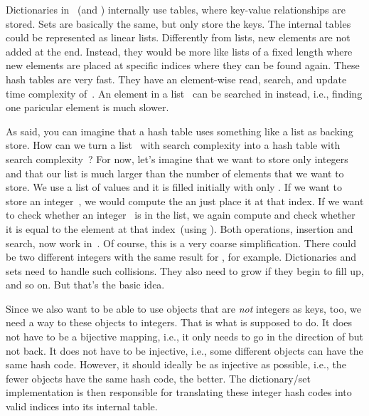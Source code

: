 Dictionaries in \python~(and ) internally use tables, where key-value relationships are stored.
Sets are basically the same, but only store the keys.
The internal tables could be represented as linear lists.
Differently from lists, new elements are not added at the end.
Instead, they would be more like lists of a fixed length where new elements are placed at specific indices where they can be found again.
These hash tables are very fast.
They have an element-wise read, search, and update time complexity of~.
An element in a list~ can be searched in  instead, i.e., finding one paricular element is much slower.

As said, you can imagine that a hash table uses something like a list as backing store.
How can we turn a list~ with search complexity  into a hash table with search complexity~?
For now, let's imagine that we want to store only integers and that our list is much larger than the number of elements that we want to store.
We use a list of  values and it is filled initially with only .
If we want to store an integer~, we would compute the   an just place it at that index.
If we want to check whether an integer~ is in the list, we again compute  and check whether it is equal to the element at that index~(using ).
Both operations, insertion and search, now work in~.
Of course, this is a very coarse simplification.
There could be two different integers with the same result for , for example.
Dictionaries and sets need to handle such collisions.
They also need to grow if they begin to fill up, and so on.
But that's the basic idea.

Since we also want to be able to use objects that are \emph{not} integers as keys, too, we need a way to  these objects to integers.
That is what  is supposed to do.
It does not have to be a bijective mapping, i.e., it only needs to go in the direction of  but not back.
It does not have to be injective, i.e., some different objects can have the same hash code.
However, it should ideally be as injective as possible, i.e., the fewer objects have the same hash code, the better.
The dictionary/set implementation is then responsible for translating these integer hash codes into valid indices into its internal table.

